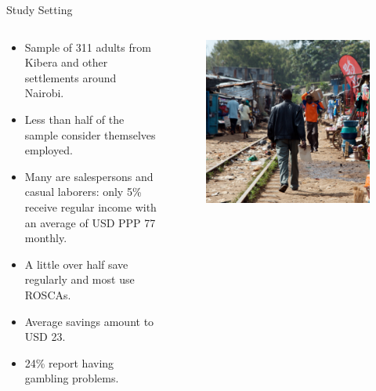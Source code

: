 \documentclass[aspectratio=169]{beamer}
\begin{document}
\begin{frame}{Study Setting}

	\begin{columns}

		\begin{column}{0.48\textwidth}

			\begin{itemize}
				\item Sample of 311 adults from Kibera and other settlements around Nairobi.
				\item Less than half of the sample consider themselves employed.
				\item Many are salespersons and casual laborers: only 5\% receive regular income with an average of USD PPP 77 monthly.
				\item A little over half save regularly and most use ROSCAs.
				\item Average savings amount to USD 23.
				\item 24\% report having gambling problems.
			\end{itemize}

		\end{column}

		\begin{column}{0.48\textwidth}

			\begin{figure}[H]
				\centering
				\includegraphics[height=0.8\textheight]{kibera-tracks-square.jpg}
			\end{figure}

		\end{column}

	\end{columns}


\end{frame}
\end{document}
